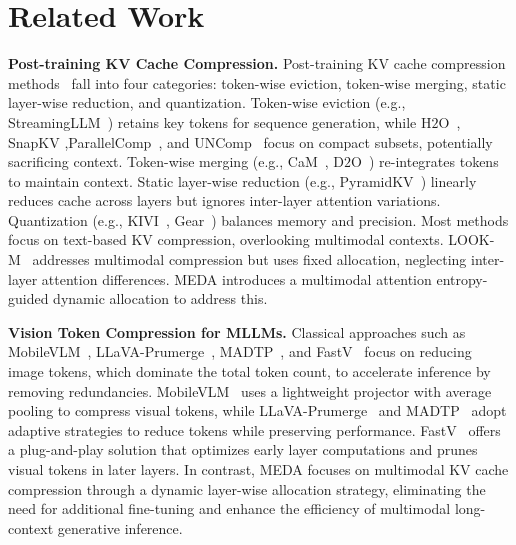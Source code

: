 \section{Related Work}
\vspace{-2mm}

\noindent \textbf{Post-training KV Cache Compression.} 
Post-training KV cache compression methods~\cite{wan2023efficient, liu2024contemporary} fall into four categories: token-wise eviction, token-wise merging, static layer-wise reduction, and quantization. Token-wise eviction (e.g., StreamingLLM~\cite{Xiao2023EfficientSL}) retains key tokens for sequence generation, while $\text{H}{2}\text{O}$~\cite{zhang2024h2o}, SnapKV \cite{Li2024SnapKVLK},ParallelComp~\cite{xiong2025parallelcomp}, and UNComp~\cite{xiong2024uncomp} focus on compact subsets, potentially sacrificing context. Token-wise merging (e.g., CaM~\cite{Zhang2024CaMCM}, $\text{D}{2} \text{O}$~\cite{wan2024d2o}) re-integrates tokens to maintain context. Static layer-wise reduction (e.g., PyramidKV~\cite{zhang2024pyramidkv}) linearly reduces cache across layers but ignores inter-layer attention variations. Quantization (e.g., KIVI~\cite{liu2024kivi}, Gear~\cite{kang2024gear}) balances memory and precision.
%
Most methods focus on text-based KV compression, overlooking multimodal contexts. LOOK-M~\cite{wan2024look} addresses multimodal compression but uses fixed allocation, neglecting inter-layer attention differences. MEDA introduces a multimodal attention entropy-guided dynamic allocation to address this.


\noindent \textbf{Vision Token Compression for MLLMs.} 
Classical approaches such as MobileVLM~\cite{chu2024mobilevlm}, LLaVA-Prumerge~\cite{Shang2024LLaVAPruMergeAT}, MADTP~\cite{Cao2024MADTPMA}, and FastV~\cite{Chen2024AnII} focus on reducing image tokens, which dominate the total token count, to accelerate inference by removing redundancies. MobileVLM~\cite{chu2024mobilevlm} uses a lightweight projector with average pooling to compress visual tokens, while LLaVA-Prumerge~\cite{Shang2024LLaVAPruMergeAT} and MADTP~\cite{Cao2024MADTPMA} adopt adaptive strategies to reduce tokens while preserving performance. FastV~\cite{Chen2024AnII} offers a plug-and-play solution that optimizes early layer computations and prunes visual tokens in later layers.
%
In contrast, MEDA focuses on multimodal KV cache compression through a dynamic layer-wise allocation strategy, eliminating the need for additional fine-tuning and enhance the efficiency of multimodal long-context generative inference.

